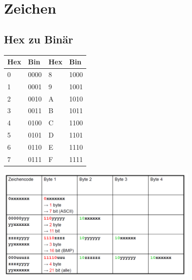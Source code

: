 \section*{Zeichen}
\subsection*{Hex zu Binär}
\begin{center}

\begin{tabular}{ll|ll}
\textbf{Hex} & \textbf{Bin} & \textbf{Hex} & \textbf{Bin} \\ \hline
\multicolumn{1}{l|}{0} & 0000 & \multicolumn{1}{l|}{8} & 1000 \\
\multicolumn{1}{l|}{1} & 0001 & \multicolumn{1}{l|}{9} & 1001 \\
\multicolumn{1}{l|}{2} & 0010 & \multicolumn{1}{l|}{A} & 1010 \\
\multicolumn{1}{l|}{3} & 0011 & \multicolumn{1}{l|}{B} & 1011 \\
\multicolumn{1}{l|}{4} & 0100 & \multicolumn{1}{l|}{C} & 1100 \\
\multicolumn{1}{l|}{5} & 0101 & \multicolumn{1}{l|}{D} & 1101 \\
\multicolumn{1}{l|}{6} & 0110 & \multicolumn{1}{l|}{E} & 1110 \\
\multicolumn{1}{l|}{7} & 0111 & \multicolumn{1}{l|}{F} & 1111
\end{tabular}

\end{center}

\begin{center}
	\includegraphics[width=10cm]{images/bitesneeded}
\end{center}
